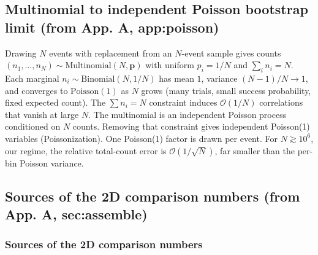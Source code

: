 \subsection{Multinomial to independent Poisson bootstrap limit (from App. A, app:poisson)}
Drawing $N$ events with replacement from an $N$-event sample gives counts $(n_{1},\dots,n_{N}) \sim \mathrm{Multinomial}(N,\mathbf{p})$ with uniform $p_{i}=1/N$ and $\sum_{i}n_{i}=N$. Each marginal $n_{i}\sim\mathrm{Binomial}(N,1/N)$ has mean $1$, variance $(N-1)/N \to 1$, and converges to $\mathrm{Poisson}(1)$ as $N$ grows (many trials, small success probability, fixed expected count). The $\sum n_{i}=N$ constraint induces $\mathcal{O}(1/N)$ correlations that vanish at large $N$. The multinomial is an independent Poisson process conditioned on $N$ counts. Removing that constraint gives independent Poisson(1) variables (Poissonization). One Poisson(1) factor is drawn per event. For $N \gtrsim 10^{6}$, our regime, the relative total-count error is $\mathcal{O}(1/\sqrt{N})$, far smaller than the per-bin Poisson variance.

\subsection{Sources of the 2D comparison numbers (from App. A, sec:assemble)}
\subsubsection*{Sources of the 2D comparison numbers}

